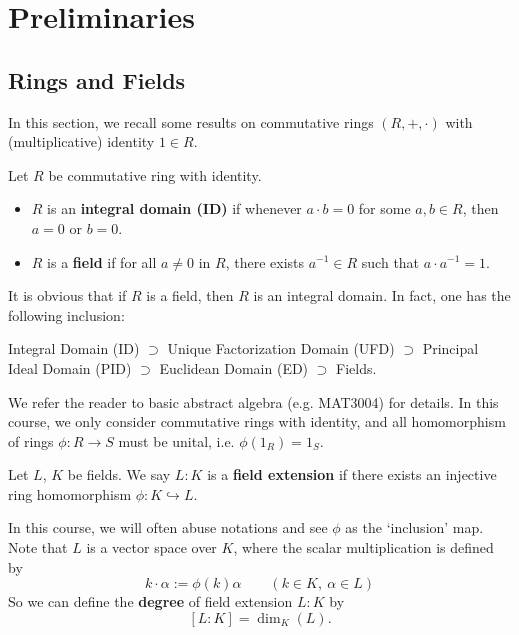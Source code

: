 \chapter{Preliminaries}
\section{Rings and Fields}
In this section, we recall some results on commutative rings $(R, +, \cdot )$ with (multiplicative) identity $1 \in R$.
\begin{definition}
    Let $R$ be commutative ring with identity. 
    \begin{itemize}
        \item $R$ is an {\bf integral domain (ID)} if whenever
    $a \cdot b = 0$ for some $a, b \in R$, then $a = 0$ or $b = 0$.
        \item $R$ is a {\bf field} if for all $a \neq 0$ in $R$, there exists $a^{-1} \in R$ such that $a \cdot a^{-1} = 1$.
    \end{itemize}
\end{definition}
It is obvious that if $R$ is a field, then $R$ is an integral domain. In fact, one has the following inclusion:
\begin{center}
Integral Domain (ID) $\supset$ Unique Factorization Domain (UFD) $\supset$ Principal Ideal Domain (PID) $\supset$ Euclidean Domain (ED) $\supset$ Fields.    
\end{center}

We refer the reader to basic abstract algebra (e.g. MAT3004) for details. In this course, we only consider commutative rings with identity, and all homomorphism of rings $\phi: R \to S$ must be unital, i.e. $\phi(1_R) = 1_S$.

\begin{definition}
    Let $L$, $K$ be fields. We say $L:K$ is a {\bf field extension} if there exists an injective ring homomorphism $\phi: K \hookrightarrow L$.
\end{definition}
In this course, we will often abuse notations and see $\phi$ as the `inclusion' map. Note that $L$ is a vector space over $K$, where the scalar multiplication is defined by
$$k \cdot \alpha := \phi(k)\alpha \quad \quad (k \in K,\ \alpha \in L)$$
So we can define the {\bf degree} of field extension $L:K$ by
$$[L:K] = \dim_{K}(L).$$


